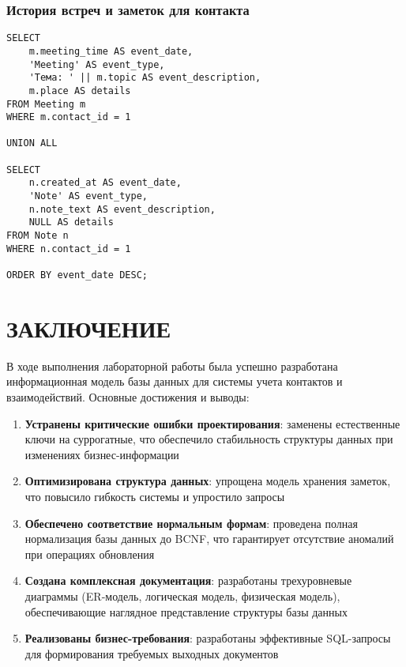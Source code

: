 \documentclass[14pt]{extarticle}
\begin{document}
\subsubsection{История встреч и заметок для контакта}

\begin{verbatim}
SELECT
    m.meeting_time AS event_date,
    'Meeting' AS event_type,
    'Тема: ' || m.topic AS event_description,
    m.place AS details
FROM Meeting m
WHERE m.contact_id = 1

UNION ALL

SELECT
    n.created_at AS event_date,
    'Note' AS event_type,
    n.note_text AS event_description,
    NULL AS details
FROM Note n
WHERE n.contact_id = 1

ORDER BY event_date DESC;
\end{verbatim}

\section{ЗАКЛЮЧЕНИЕ}

В ходе выполнения лабораторной работы была успешно разработана информационная модель базы данных для системы учета контактов и взаимодействий. Основные достижения и выводы:

\begin{enumerate}
    \item \textbf{Устранены критические ошибки проектирования}: заменены естественные ключи на суррогатные, что обеспечило стабильность структуры данных при изменениях бизнес-информации

    \item \textbf{Оптимизирована структура данных}: упрощена модель хранения заметок, что повысило гибкость системы и упростило запросы

    \item \textbf{Обеспечено соответствие нормальным формам}: проведена полная нормализация базы данных до BCNF, что гарантирует отсутствие аномалий при операциях обновления

    \item \textbf{Создана комплексная документация}: разработаны трехуровневые диаграммы (ER-модель, логическая модель, физическая модель), обеспечивающие наглядное представление структуры базы данных

    \item \textbf{Реализованы бизнес-требования}: разработаны эффективные SQL-запросы для формирования требуемых выходных документов
\end{enumerate}
\end{document}
